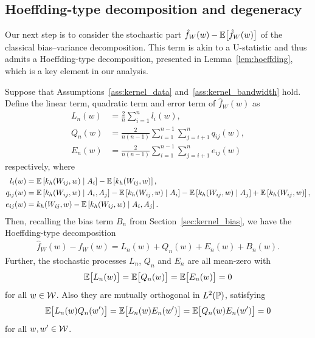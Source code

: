 \subsection{Hoeffding-type decomposition and degeneracy}
\label{sec:degeneracy}

Our next step is to consider the stochastic part
$\hat f_W(w) - \E \big[ \hat f_W(w) \big]$
of the classical bias--variance decomposition.
This term is akin to a
U-statistic and thus admits a Hoeffding-type decomposition,
presented in Lemma~\ref{lem:hoeffding},
which is a key element in our analysis.

\begin{lemma}
  \label{lem:hoeffding}

  Suppose that Assumptions~\ref{ass:kernel_data}
  and~\ref{ass:kernel_bandwidth}
  hold.
  Define the linear term,
  quadratic term
  and error term
  of $\hat f_W(w)$ as
  \begin{align*}
    L_n(w)
    &=
    \frac{2}{n} \sum_{i=1}^n
    l_i(w), \\
    Q_n(w)
    &=
    \frac{2}{n(n-1)}
    \sum_{i=1}^{n-1}
    \sum_{j=i+1}^{n}
    q_{i j}(w), \\
    E_n(w)
    &=
    \frac{2}{n(n-1)}
    \sum_{i=1}^{n-1}
    \sum_{j=i+1}^{n}
    e_{i j}(w)
  \end{align*}
  respectively, where
  \begin{align*}
    l_i(w)
    &=
    \E\left[k_h(W_{i j},w) \mid A_i\right] - \E\left[k_h(W_{i j},w)\right], \\
    q_{i j}(w)
    &=
    \E\left[k_h(W_{i j},w) \mid A_i, A_j\right]
    - \E\left[k_h(W_{i j},w) \mid A_i\right]
    - \E\left[k_h(W_{i j},w) \mid A_j\right]
    + \E\left[k_h(W_{i j},w)\right], \\
    e_{i j}(w)
    &=
    k_h(W_{i j},w)
    - \E\left[k_h(W_{i j},w) \mid A_i, A_j\right].
  \end{align*}
  Then, recalling the bias term $B_n$ from
  Section~\ref{sec:kernel_bias},
  we have the Hoeffding-type decomposition
  \begin{align}
    \label{eq:h-decomposition}
    \hat f_W(w) - f_W(w)
    = L_n(w)
    + Q_n(w)
    + E_n(w)
    + B_n(w).
  \end{align}
  Further,
  the stochastic processes
  $L_n$, $Q_n$ and $E_n$
  are all mean-zero with
  \begin{equation*}
    \E\big[L_n(w)\big]
    = \E\big[Q_n(w)\big]
    = \E\big[E_n(w)\big]
    = 0
  \end{equation*}
  for all $w \in \cW$.
  Also they are mutually orthogonal
  in $L^2(\P)$, satisfying
  \begin{equation*}
    \E\big[
      L_n(w) Q_n(w')
    \big]
    = \E\big[
      L_n(w) E_n(w')
    \big]
    = \E\big[
      Q_n(w) E_n(w')
    \big]
    = 0
  \end{equation*}
  for all $w, w' \in \cW$.

\end{lemma}

